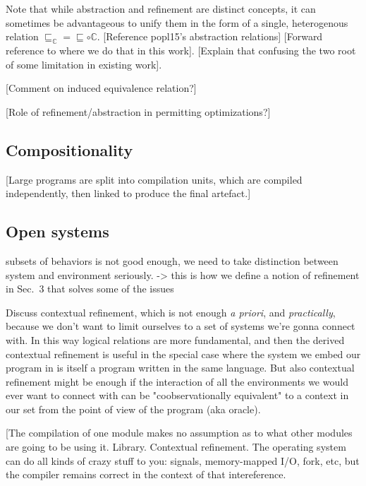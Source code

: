 \documentclass[sigplan,10pt,review,anonymous]{acmart}
\begin{document}
Note that while abstraction and refinement are distinct concepts,
it can sometimes be advantageous to unify them
in the form of a single, heterogenous relation
${\sqsubseteq_\mathbb{C}} = {\sqsubseteq} \circ {\mathbb{C}}$.
[Reference popl15's abstraction relations]
[Forward reference to where we do that in this work].
[Explain that confusing the two root of some limitation
in existing work].

[Comment on induced equivalence relation?]

[Role of refinement/abstraction in permitting optimizations?]


\subsection{Compositionality} %

[Large programs are split into compilation units,
which are compiled independently,
then linked to produce the final artefact.]


\subsection{Open systems} %

subsets of behaviors is not good enough,
we need to take distinction between system and environment seriously.
-> this is how we define a notion of refinement in Sec.~3
that solves some of the issues

Discuss contextual refinement,
which is not enough \emph{a priori}, and \emph{practically},
because we don't want to limit ourselves to a set of systems we're gonna connect with.
In this way logical relations are more fundamental,
and then the derived contextual refinement is useful
in the special case where the system we embed our program in
is itself a program written in the same language.
But also contextual refinement might be enough
if the interaction of all the environments we would ever want to connect with
can be "coobservationally equivalent" to a context in our set
from the point of view of the program (aka oracle).

[The compilation of one module
makes no assumption as to what other modules are going to be using it.
Library. Contextual refinement.
The operating system can do all kinds of crazy stuff to you:
signals, memory-mapped I/O, fork, etc,
but the compiler remains correct in the context of that intereference.
\end{document}
